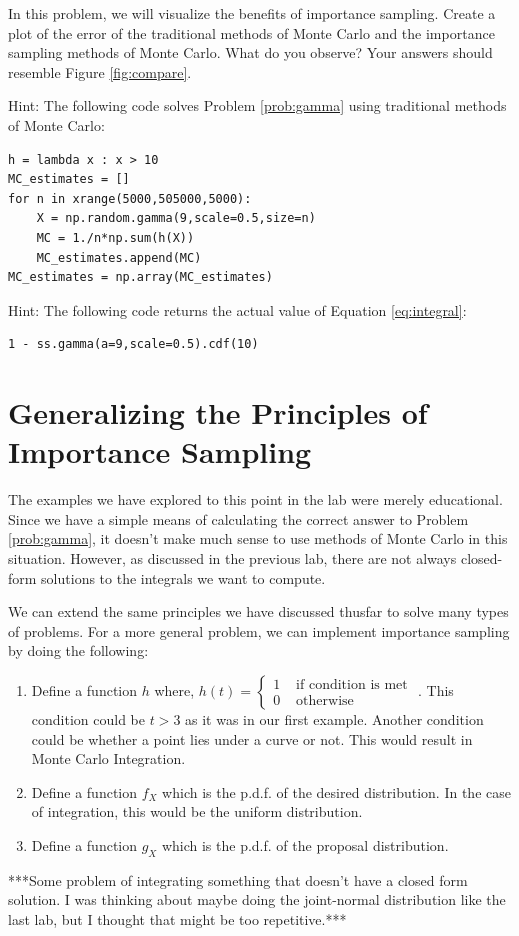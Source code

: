 \begin{problem}
In this problem, we will visualize the benefits of importance sampling. Create a plot of the error of the traditional methods of Monte Carlo and the importance sampling methods of Monte Carlo. What do you observe? Your answers should resemble Figure \ref{fig:compare}.

Hint: The following code solves Problem \ref{prob:gamma} using traditional methods of Monte Carlo:
\begin{lstlisting}
h = lambda x : x > 10
MC_estimates = []
for n in xrange(5000,505000,5000):
    X = np.random.gamma(9,scale=0.5,size=n)
    MC = 1./n*np.sum(h(X))    
    MC_estimates.append(MC)
MC_estimates = np.array(MC_estimates)
\end{lstlisting}

Hint: The following code returns the actual value of Equation \ref{eq:integral}:
\begin{lstlisting}
1 - ss.gamma(a=9,scale=0.5).cdf(10)
\end{lstlisting}
\end{problem}

\section*{Generalizing the Principles of Importance Sampling}
The examples we have explored to this point in the lab were merely educational. Since we have a simple means of calculating the correct answer to Problem \ref{prob:gamma}, it doesn't make much sense to use methods of Monte Carlo in this situation. However, as discussed in the previous lab, there are not always closed-form solutions to the integrals we want to compute.

We can extend the same principles we have discussed thusfar to solve many types of problems. For a more general problem, we can implement importance sampling by doing the following:
\begin{enumerate}
\item Define a function $h$ where, $h(t) = \begin{cases}
1 & \text{ if condition is met }  \\ 
0 & \text{ otherwise}
\end{cases} $. 
This condition could be $t > 3$ as it was in our first example. Another condition could be whether a point lies under a curve or not. This would result in Monte Carlo Integration.
\item Define a function $f_X$ which is the p.d.f. of the desired distribution. In the case of integration, this would be the uniform distribution.
\item Define a function $g_X$ which is the p.d.f. of the proposal distribution.
\end{enumerate}

\begin{problem}
***Some problem of integrating something that doesn't have a closed form solution. I was thinking about maybe doing the joint-normal distribution like the last lab, but I thought that might be too repetitive.***
\end{problem}
